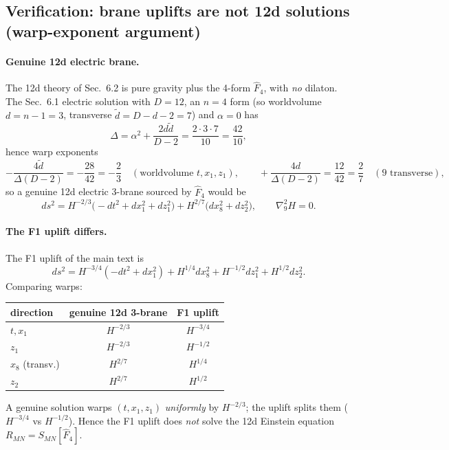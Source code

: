 
\subsection*{Verification: brane uplifts are not 12d solutions (warp-exponent argument)}

\paragraph{Genuine 12d electric brane.}
The 12d theory of Sec.~6.2 is pure gravity plus the 4-form $\hat F_4$, with \emph{no} dilaton.
The Sec.~6.1 electric solution with $D=12$, an $n=4$ form (so worldvolume $d=n-1=3$, transverse
$\tilde d = D-d-2 = 7$) and $\alpha=0$ has
\begin{equation}
\Delta = \alpha^2 + \frac{2 d\tilde d}{D-2} = \frac{2\cdot 3\cdot 7}{10} = \frac{42}{10},
\end{equation}
hence warp exponents
\begin{equation}
-\frac{4\tilde d}{\Delta(D-2)} = -\frac{28}{42} = -\frac23
\quad(\text{worldvolume } t,x_1,z_1),
\qquad
+\frac{4 d}{\Delta(D-2)} = \frac{12}{42} = \frac27
\quad(\text{9 transverse}),
\end{equation}
so a genuine 12d electric 3-brane sourced by $\hat F_4$ would be
\begin{equation}
ds^2 = H^{-2/3}\big(-dt^2+dx_1^2+dz_1^2\big) + H^{2/7}\big(dx_8^2 + dz_2^2\big),
\qquad \nabla^2_{9}H = 0 .
\end{equation}

\paragraph{The F1 uplift differs.}
The F1 uplift of the main text is
\begin{equation}
ds^2 = H^{-3/4}(-dt^2+dx_1^2) + H^{1/4}dx_8^2 + H^{-1/2}dz_1^2 + H^{1/2}dz_2^2 .
\end{equation}
Comparing warps:
\begin{center}
\begin{tabular}{l|cc}
direction & genuine 12d 3-brane & F1 uplift\\\hline
$t,x_1$ & $H^{-2/3}$ & $H^{-3/4}$\\
$z_1$ & $H^{-2/3}$ & $H^{-1/2}$\\
$x_8$ (transv.) & $H^{2/7}$ & $H^{1/4}$\\
$z_2$ & $H^{2/7}$ & $H^{1/2}$
\end{tabular}
\end{center}
A genuine solution warps $(t,x_1,z_1)$ \emph{uniformly} by $H^{-2/3}$; the uplift splits them
($H^{-3/4}$ vs $H^{-1/2}$). Hence the F1 uplift does \emph{not} solve the 12d Einstein equation
$R_{MN}=S_{MN}[\hat F_4]$.

